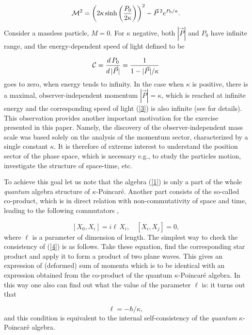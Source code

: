 \documentclass[a4paper,a4paper]{article}
\begin{document}
\begin{equation}\label{2}
  {\cal M}^2 = \left(2\kappa \sinh\left(\frac{P_0}{2\kappa}\right)\right)^2 - \vec{P}\,{}^2 e^{P_0/\kappa}.
\end{equation}
Consider a massless particle, $M=0$. For $\kappa$ negative, both $|\vec{P}|$ and $P_0$ have infinite range, and the energy-dependent speed of light defined to be

\begin{equation}\label{3}
 {\cal C} = \frac{d\, P_0}{d\, |\vec{P}|} = \frac{1}{1 - |\vec{P}|/\kappa}
\end{equation}
goes to zero, when energy tends to infinity. In the case when $\kappa$ is positive, there is a maximal, observer-independent momentum $|\vec{P}| =\kappa$, which is reached at infinite energy and the corresponding speed of light (\ref{3}) is also infinite (see \cite{jkgminl, rbgacjkg} for details). This observation provides another important motivation for the exercise presented in this paper. Namely, the discovery of the observer-independent mass scale  was based solely on the analysis of the momentum sector, characterized by a single constant $\kappa$. It is therefore of extreme interest to understand the position sector of the phase space, which is necessary e.g., to study the particles motion, investigate the structure of space-time, etc.

To achieve this goal let us note that the algebra (\ref{1}) is only a part of the whole {\em quantum} algebra structure of $\kappa$-Poincar\'e. Another part consists of the so-called co-product, which is in  direct relation with non-commutativity of space and time, leading to the following commutators  \cite{szak}, \cite{maru}

\begin{equation}\label{4}
 [ X_0, X_i ] = i\ell\, X_i, \quad [ X_i, X_j ] =0,
\end{equation}
where $\ell$ is a parameter of dimension of length. The simplest way to check the consistency of (\ref{4}) is as follows. Take these equation, find the corresponding star product and apply it to form a product of two plane waves. This gives an expression of (deformed) sum of momenta which is to be identical with an expression obtained from the co-product of the quantum $\kappa$-Poincar\'e algebra. In this way one also can find out what  the value of the parameter $\ell$ is:   it turns out that

\begin{equation}\label{rel}
  \ell = - \hbar/\kappa,
\end{equation}
  and this condition is equivalent to the internal self-consistency of the {\em quantum} $\kappa$-Poincar\'e algebra.  
\end{document}
